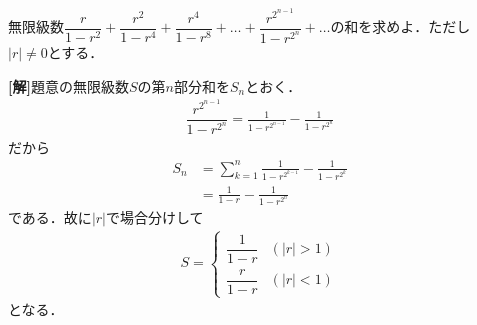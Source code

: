 \documentclass[a4j]{jarticle}
\begin{document}

     \begin{oframed}
     無限級数$\dfrac{r}{1-r^2}+\dfrac{r^2}{1-r^4}+\dfrac{r^4}{1-r^8}%
     +\dots+\dfrac{r^{2^{n-1}}}{1-r^{2^n}}+\dots$の和を求めよ．ただし
     $|r|\not=0$とする．
     \end{oframed}

\setlength{\columnseprule}{0.4pt}
\begin{multicols}{2}
{\bf[解]}題意の無限級数$S$の第$n$部分和を$S_n$とおく．
     \begin{align*}
     \dfrac{r^{2^{n-1}}}{1-r^{2^n}}=\frac{1}{1-r^{2^{n-1}}}-%
     \frac{1}{1-r^{2^n}}
     \end{align*}
だから
     \begin{align*}
     S_n&=\sum_{k=1}^n\frac{1}{1-r^{2^{k-1}}}-\frac{1}{1-r^{2^k}} \\
     &=\frac{1}{1-r}-\frac{1}{1-r^{2^n}}
     \end{align*}
である．故に$|r|$で場合分けして
     \begin{align*}
     S=\left\{
          \begin{array}{ll}
          \dfrac{1}{1-r} & (|r|>1) \\
          \dfrac{r}{1-r}  & (|r|<1)
          \end{array}
     \right.\tag{答}
     \end{align*}   
となる．                
\newpage
\end{multicols}
\end{document}
